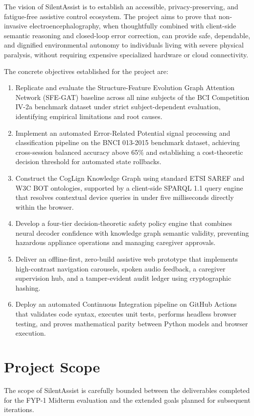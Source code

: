 \documentclass[12pt,a4paper]{report}
\begin{document}
The vision of SilentAssist is to establish an accessible, privacy-preserving, and fatigue-free assistive control ecosystem. The project aims to prove that non-invasive electroencephalography, when thoughtfully combined with client-side semantic reasoning and closed-loop error correction, can provide safe, dependable, and dignified environmental autonomy to individuals living with severe physical paralysis, without requiring expensive specialized hardware or cloud connectivity.

The concrete objectives established for the project are:
\begin{enumerate}[leftmargin=1.5em]
    \item Replicate and evaluate the Structure-Feature Evolution Graph Attention Network (SFE-GAT) baseline across all nine subjects of the BCI Competition IV-2a benchmark dataset under strict subject-dependent evaluation, identifying empirical limitations and root causes.
    \item Implement an automated Error-Related Potential signal processing and classification pipeline on the BNCI 013-2015 benchmark dataset, achieving cross-session balanced accuracy above 65\% and establishing a cost-theoretic decision threshold for automated state rollbacks.
    \item Construct the CogLign Knowledge Graph using standard ETSI SAREF and W3C BOT ontologies, supported by a client-side SPARQL 1.1 query engine that resolves contextual device queries in under five milliseconds directly within the browser.
    \item Develop a four-tier decision-theoretic safety policy engine that combines neural decoder confidence with knowledge graph semantic validity, preventing hazardous appliance operations and managing caregiver approvals.
    \item Deliver an offline-first, zero-build assistive web prototype that implements high-contrast navigation carousels, spoken audio feedback, a caregiver supervision hub, and a tamper-evident audit ledger using cryptographic hashing.
    \item Deploy an automated Continuous Integration pipeline on GitHub Actions that validates code syntax, executes unit tests, performs headless browser testing, and proves mathematical parity between Python models and browser execution.
\end{enumerate}

\section{Project Scope}
The scope of SilentAssist is carefully bounded between the deliverables completed for the FYP-1 Midterm evaluation and the extended goals planned for subsequent iterations.
\end{document}
